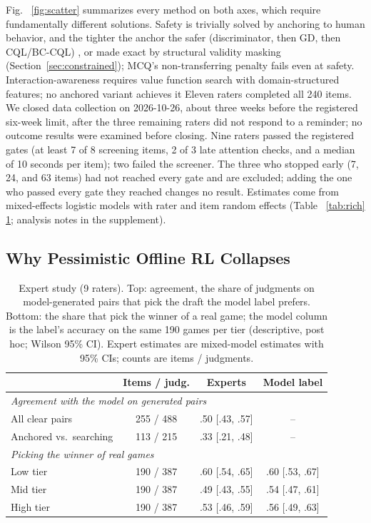 \documentclass[journal]{IEEEtran}
\providecommand{\DIFaddtex}[1]{{\protect\color{blue} \sf #1}} %
\providecommand{\DIFdeltex}[1]{{\protect\color{red} \scriptsize #1}} %
\providecommand{\DIFaddbegin}{} %
\providecommand{\DIFaddend}{} %
\providecommand{\DIFdelbegin}{} %
\providecommand{\DIFdelend}{} %
\providecommand{\DIFaddFL}[1]{\DIFadd{#1}} %
\providecommand{\DIFadd}[1]{\texorpdfstring{\DIFaddtex{#1}}{#1}} %
\providecommand{\DIFdel}[1]{\texorpdfstring{\DIFdeltex{#1}}{}} %
\begin{document}
\DIFdel{Fig. ~\ref{fig:scatter} summarizes every method on both axes, which require fundamentally different solutions. Safety is trivially solved by anchoring to human behavior, and the tighter the anchor the safer (discriminator, then GD, then CQL/BC-CQL) , or made exact by structural validity masking (Section~\ref{sec:constrained}); MCQ's non-transferring penalty fails even at safety. Interaction-awareness requires value function search with domain-structured features; no anchored variant achieves it }\DIFdelend \DIFaddbegin \DIFadd{Eleven raters completed all 240 items. We closed data collection on 2026-10-26, about three weeks before the registered six-week limit, after the three remaining raters did not respond to a reminder; no outcome results were examined before closing. Nine raters passed the registered gates (at least 7 of 8 screening items, 2 of 3 late attention checks, and a median of 10 seconds per item); two failed the screener. The three who stopped early (7, 24, and 63 items) had not reached every gate and are excluded; adding the one who passed every gate they reached changes no result. Estimates come from mixed-effects logistic models with rater and item random effects }\DIFaddend (Table~\DIFdelbegin \DIFdel{\ref{tab:rich}}\DIFdelend \DIFaddbegin \DIFadd{\ref{tab:expert}; analysis notes in the supplement}\DIFaddend ).

\DIFdelbegin \subsection{\DIFdel{Why Pessimistic Offline RL Collapses}}
\addtocounter{subsection}{-1}%
\DIFdelend \DIFaddbegin \begin{table}[t]
\centering
\caption{\DIFaddFL{Expert study (9 raters). Top: agreement, the share of judgments on model-generated pairs that pick the draft the model label prefers. Bottom: the share that pick the winner of a real game; the model column is the label's accuracy on the same 190 games per tier (descriptive, post hoc; Wilson 95\% CI). Expert estimates are mixed-model estimates with 95\% CIs; counts are items / judgments.}}
\label{tab:expert}
\setlength{\tabcolsep}{2.5pt}
\small
\begin{tabular}{lccc}
\toprule
 & Items / judg. & Experts & Model label \\
\midrule
\multicolumn{4}{l}{\textit{Agreement with the model on generated pairs}} \\
All clear pairs & 255 / 488 & .50 [.43, .57] & -- \\
Anchored vs.\ searching & 113 / 215 & .33 [.21, .48] & -- \\
\midrule
\multicolumn{4}{l}{\textit{Picking the winner of real games}} \\
Low tier & 190 / 387 & .60 [.54, .65] & .60 [.53, .67] \\
Mid tier & 190 / 387 & .49 [.43, .55] & .54 [.47, .61] \\
High tier & 190 / 387 & .53 [.46, .59] & .56 [.49, .63] \\
\bottomrule
\end{tabular}
\end{table}
\DIFaddend 
\end{document}
